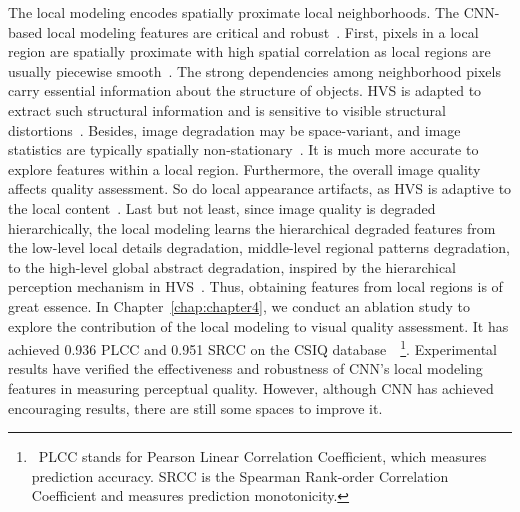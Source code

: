 The local modeling encodes spatially proximate local neighborhoods. The CNN-based local modeling features are critical and robust~\citep{zhang2018unreasonable, ding2021comparison, dingIQA}. First, pixels in a local region are spatially proximate with high spatial correlation as local regions are usually piecewise smooth~\citep{mittal2012no}. The strong dependencies among neighborhood pixels carry essential information about the structure of objects. HVS is adapted to extract such structural information and is sensitive to visible structural distortions~\citep{wang2004image}. Besides, image degradation may be space-variant, and image statistics are typically spatially non-stationary~\citep{sun2018spsim}. It is much more accurate to explore features within a local region. Furthermore, the overall image quality affects quality assessment. So do local appearance artifacts, as HVS is adaptive to the local content~\citep{liu2020long, wang2005adaptive}. Last but not least, since image quality is degraded hierarchically, the local modeling learns the hierarchical degraded features from the low-level local details degradation, middle-level regional patterns degradation, to the high-level global abstract degradation, inspired by the hierarchical perception mechanism in HVS~\citep{wu2020end}. Thus, obtaining features from local regions is of great essence. In Chapter~\ref{chap:chapter4}, we conduct an ablation study to explore the contribution of the local modeling to visual quality assessment. It has achieved 0.936 PLCC and 0.951 SRCC on the CSIQ database~\citep{larson2010most}~\footnote{~PLCC stands for Pearson Linear Correlation Coefficient, which measures prediction accuracy. SRCC is the Spearman Rank-order Correlation Coefficient and measures prediction monotonicity.}. Experimental results have verified the effectiveness and robustness of CNN's local modeling features in measuring perceptual quality. However, although CNN has achieved encouraging results, there are still some spaces to improve it.

	
